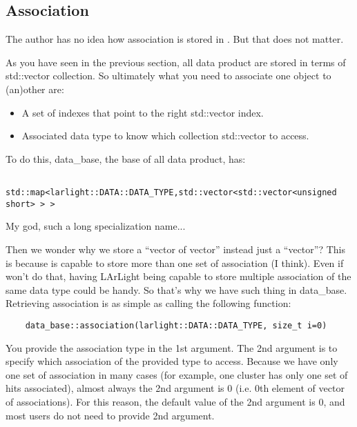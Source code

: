 \subsection{Association}

The author has no idea how association is stored in \ART. But that does not matter.

As you have seen in the previous section, all data product are stored in terms of {\ttfamily std::vector} collection.
So ultimately what you need to associate one object to (an)other are:
\begin{itemize}
\item A set of indexes that point to the right {\ttfamily std::vector} index.
\item Associated data type to know which collection {\ttfamily std::vector} to access.
\end{itemize}
To do this, {\ttfamily data\_base}, the base of all data product, has:
\begin{lstlisting}
    std::map<larlight::DATA::DATA_TYPE,std::vector<std::vector<unsigned short> > > 
\end{lstlisting}
My god, such a long specialization name... 

Then we wonder why we store a ``vector of vector'' instead just a ``vector''?
This is because \ART is capable to store more than one set of association (I think).
Even if \ART won't do that, having LArLight being capable to store multiple association of the same data type could be handy.
So that's why we have such thing in {\ttfamily data\_base}.\\

Retrieving association is as simple as calling the following function:
\begin{lstlisting}
    data_base::association(larlight::DATA::DATA_TYPE, size_t i=0)
\end{lstlisting}
You provide the association type in the 1st argument.
The 2nd argument is to specify which association of the provided type to access.
Because we have only one set of association in many cases (for example, one cluster has only one set of hits associated), almost always the 2nd argument is 0 (i.e. 0th element of vector of associations).
For this reason, the default value of the 2nd argument is 0, and most users do not need to provide 2nd argument.
